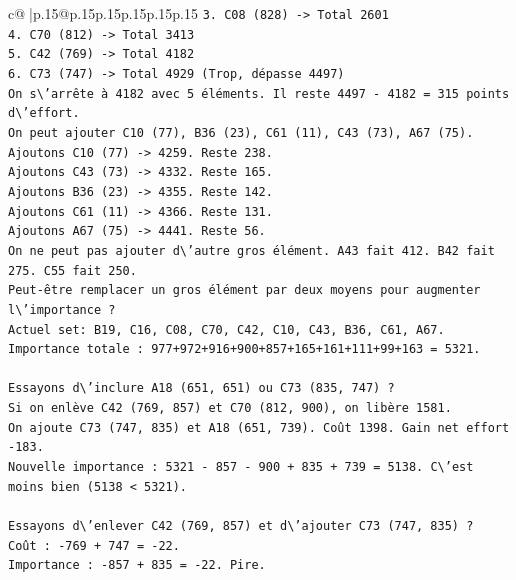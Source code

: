 \documentclass{article}
\begin{document}
{\begin{supertabular}{c@{$\;$}|p{.15\linewidth}@{}p{.15\linewidth}p{.15\linewidth}p{.15\linewidth}p{.15\linewidth}p{.15\linewidth}}
{{{\texttt{3. C08 (828) {-}> Total 2601} \\
\texttt{4. C70 (812) {-}> Total 3413} \\
\texttt{5. C42 (769) {-}> Total 4182} \\
\texttt{6. C73 (747) {-}> Total 4929 (Trop, dépasse 4497)} \\
\texttt{On s\textbackslash{}'arrête à 4182 avec 5 éléments. Il reste 4497 {-} 4182 = 315 points d\textbackslash{}'effort.} \\
\texttt{On peut ajouter C10 (77), B36 (23), C61 (11), C43 (73), A67 (75).} \\
\texttt{Ajoutons C10 (77) {-}> 4259. Reste 238.} \\
\texttt{Ajoutons C43 (73) {-}> 4332. Reste 165.} \\
\texttt{Ajoutons B36 (23) {-}> 4355. Reste 142.} \\
\texttt{Ajoutons C61 (11) {-}> 4366. Reste 131.} \\
\texttt{Ajoutons A67 (75) {-}> 4441. Reste 56.} \\
\texttt{On ne peut pas ajouter d\textbackslash{}'autre gros élément. A43 fait 412. B42 fait 275. C55 fait 250.} \\
\texttt{Peut{-}être remplacer un gros élément par deux moyens pour augmenter l\textbackslash{}'importance ?} \\
\texttt{Actuel set: B19, C16, C08, C70, C42, C10, C43, B36, C61, A67.} \\
\texttt{Importance totale : 977+972+916+900+857+165+161+111+99+163 = 5321.} \\
\\ 
\texttt{Essayons d\textbackslash{}'inclure A18 (651, 651) ou C73 (835, 747) ?} \\
\texttt{Si on enlève C42 (769, 857) et C70 (812, 900), on libère 1581.} \\
\texttt{On ajoute C73 (747, 835) et A18 (651, 739). Coût 1398. Gain net effort {-}183.} \\
\texttt{Nouvelle importance : 5321 {-} 857 {-} 900 + 835 + 739 = 5138. C\textbackslash{}'est moins bien (5138 < 5321).} \\
\\ 
\texttt{Essayons d\textbackslash{}'enlever C42 (769, 857) et d\textbackslash{}'ajouter C73 (747, 835) ?} \\
\texttt{Coût : {-}769 + 747 = {-}22.} \\
\texttt{Importance : {-}857 + 835 = {-}22. Pire.} \\
\\ 
}}}
\end{supertabular}}
\end{document}
